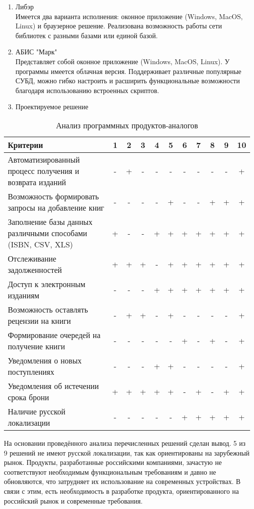\documentclass[./intro.tex]{subfiles}
\begin{document}
\begin{enumerate}
    \item Либэр \cite{Liber} \\
    Имеется два варианта исполнения: оконное приложение (Windows, MacOS, Linux) и браузерное решение. Реализована возможность работы сети библиотек с разными базами или единой базой.
    \item АБИС "Марк" \cite{ABISmark} \\
    Представляет собой оконное приложение (Windows, MacOS, Linux). У программы имеется облачная версия. Поддерживает различные популярные СУБД, можно гибко настроить и расширить функциональные возможности благодаря использованию встроенных скриптов.
    \item Проектируемое решение
\end{enumerate}

\begin{table}[h]
    \caption{Анализ программных продуктов-аналогов}
    \label{table:1}
    \begin{tabular}{|p{9cm}|c|c|c|c|c|c|c|c|c|c|}
        \hline
        Критерии & 1 & 2 & 3 & 4 & 5 & 6 & 7 & 8 & 9 & 10\\
        \hline
        Автоматизированный процесс получения и возврата изданий & - & + & - & - & - & - & - & - & - & + \\
        \hline
        Возможность формировать запросы на добавление книг & - & - & - & - & + & - & - & + & + & + \\
        \hline
        Заполнение базы данных различными способами (ISBN, CSV, XLS) & + & - & - & + & + & + & + & + & + & + \\
        \hline
        Отслеживание задолженностей & + & + & + & - & + & + & + & + & + & + \\
        \hline
        Доступ к электронным изданиям & - & - & - & + & + & + & + & + & + & + \\
        \hline
        Возможность оставлять рецензии на книги & - & + & + & - & + & - & - & - & - & + \\
        \hline
        Формирование очередей на получение книги & - & - & - & - & - & + & - & + & - & + \\
        \hline
        Уведомления о новых поступлениях & - & - & - & + & + & - & - & - & - & + \\
        \hline
        Уведомления об истечении срока брони & + & + & + & + & + & - & + & - & + & + \\
        \hline
        Наличие русской локализации & - & - & - & - & - & + & + & + & + & + \\
        \hline
    \end{tabular}    
\end{table}

\par На основании проведённого анализа перечисленных решений сделан вывод. 5 из 9 решений не имеют русской локализации, так как ориентированы на зарубежный рынок.
Продукты, разработанные российскими компаниями, зачастую не соответствуют необходимым функциональным требованиям и давно не обновляются, что затрудняет их использование на современных устройствах.
В связи с этим, есть необходимость в разработке продукта, ориентированного на российский рынок и современные требования.
\end{document}
